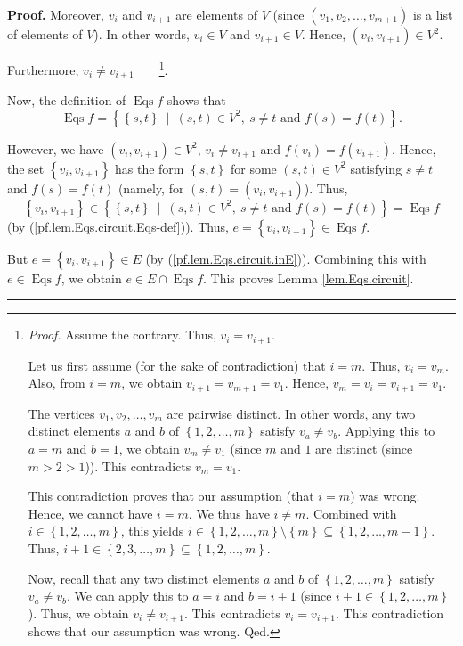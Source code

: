 \documentclass[numbers=enddot,12pt,final,onecolumn,notitlepage]{scrartcl}%
\theoremstyle{definition}
\newenvironment{proof}[1][Proof]{\noindent\textbf{#1.} }{\ \rule{0.5em}{0.5em}}
\newenvironment{verlong}{}{}
\begin{document}
\begin{verlong}
\begin{proof}
Moreover, $v_{i}$ and $v_{i+1}$ are elements of $V$ (since $\left(
v_{1},v_{2},\ldots,v_{m+1}\right)  $ is a list of elements of $V$). In other
words, $v_{i}\in V$ and $v_{i+1}\in V$. Hence, $\left(  v_{i},v_{i+1}\right)
\in V^{2}$.

Furthermore, $v_{i}\neq v_{i+1}$\ \ \ \ \footnote{\textit{Proof.} Assume the
contrary. Thus, $v_{i}=v_{i+1}$.
\par
Let us first assume (for the sake of contradiction) that $i=m$. Thus,
$v_{i}=v_{m}$. Also, from $i=m$, we obtain $v_{i+1}=v_{m+1}=v_{1}$. Hence,
$v_{m}=v_{i}=v_{i+1}=v_{1}$.
\par
The vertices $v_{1},v_{2},\ldots,v_{m}$ are pairwise distinct. In other words,
any two distinct elements $a$ and $b$ of $\left\{  1,2,\ldots,m\right\}  $
satisfy $v_{a}\neq v_{b}$. Applying this to $a=m$ and $b=1$, we obtain
$v_{m}\neq v_{1}$ (since $m$ and $1$ are distinct (since $m>2>1$)). This
contradicts $v_{m}=v_{1}$.
\par
This contradiction proves that our assumption (that $i=m$) was wrong. Hence,
we cannot have $i=m$. We thus have $i\neq m$. Combined with $i\in\left\{
1,2,\ldots,m\right\}  $, this yields $i\in\left\{  1,2,\ldots,m\right\}
\setminus\left\{  m\right\}  \subseteq\left\{  1,2,\ldots,m-1\right\}  $.
Thus, $i+1\in\left\{  2,3,\ldots,m\right\}  \subseteq\left\{  1,2,\ldots
,m\right\}  $.
\par
Now, recall that any two distinct elements $a$ and $b$ of $\left\{
1,2,\ldots,m\right\}  $ satisfy $v_{a}\neq v_{b}$. We can apply this to $a=i$
and $b=i+1$ (since $i+1\in\left\{  1,2,\ldots,m\right\}  $). Thus, we obtain
$v_{i}\neq v_{i+1}$. This contradicts $v_{i}=v_{i+1}$. This contradiction
shows that our assumption was wrong. Qed.}.

Now, the definition of $\operatorname*{Eqs}f$ shows that%
\begin{equation}
\operatorname*{Eqs}f=\left\{  \left\{  s,t\right\}  \ \mid\ \left(
s,t\right)  \in V^{2},\ s\neq t\text{ and }f\left(  s\right)  =f\left(
t\right)  \right\}  . \label{pf.lem.Eqs.circuit.Eqs-def}%
\end{equation}


However, we have $\left(  v_{i},v_{i+1}\right)  \in V^{2}$, $v_{i}\neq
v_{i+1}$ and $f\left(  v_{i}\right)  =f\left(  v_{i+1}\right)  $. Hence, the
set $\left\{  v_{i},v_{i+1}\right\}  $ has the form $\left\{  s,t\right\}  $
for some $\left(  s,t\right)  \in V^{2}$ satisfying $s\neq t$ and $f\left(
s\right)  =f\left(  t\right)  $ (namely, for $\left(  s,t\right)  =\left(
v_{i},v_{i+1}\right)  $). Thus,%
\[
\left\{  v_{i},v_{i+1}\right\}  \in\left\{  \left\{  s,t\right\}
\ \mid\ \left(  s,t\right)  \in V^{2},\ s\neq t\text{ and }f\left(  s\right)
=f\left(  t\right)  \right\}  =\operatorname*{Eqs}f
\]
(by (\ref{pf.lem.Eqs.circuit.Eqs-def})). Thus, $e=\left\{  v_{i}%
,v_{i+1}\right\}  \in\operatorname*{Eqs}f$.

But $e=\left\{  v_{i},v_{i+1}\right\}  \in E$ (by
(\ref{pf.lem.Eqs.circuit.inE})). Combining this with $e\in\operatorname*{Eqs}%
f$, we obtain $e\in E\cap\operatorname*{Eqs}f$. This proves Lemma
\ref{lem.Eqs.circuit}.
\end{proof}
\end{verlong}
\end{document}
